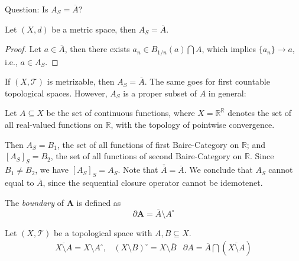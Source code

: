 Question: Is $A_S=\overline{A}$?

\begin{proposition}
Let $(X,d)$ be a metric space, then $A_S=\bar{A}$.
\end{proposition}

\begin{proof}
Let $a\in\overline{A}$, 
then there exists $a_n\in B_{1/n}(a)\bigcap A$, 
which implies $\{a_n\}\to a$, i.e., 
$a\in A_S$.
\end{proof}

\begin{remark}
If $(X,\mathcal{T})$ is metrizable, then $A_S=\overline A$. 
The same goes for first countable topological spaces.
However, $A_S$ is a proper subset of $A$ in general:

Let $A\subseteq X$ be the set of continuous functions, where $X=\mathbb{R}^{\mathbb{R}}$ denotes the set of all real-valued functions on $\mathbb{R}$, with the topology of pointwise convergence.

Then $A_S=B_1$, the set of all functions of first Baire-Category on $\mathbb{R}$; and $[A_S]_S=B_2$, the set of all functions of second Baire-Category on $\mathbb{R}$. Since $B_1\ne B_2$, we have $[A_S]_S=A_S$. Note that $\overline{\overline{A}}=\overline{A}$. We conclude that $A_S$ cannot equal to $\overline{A}$, since the sequential closure operator cannot be idemotenet.
\end{remark}

\begin{definition}[Boundary]
The \emph{boundary} of $\bm A$ is defined as
\[
\partial\bm A=\overline{A}\setminus A^\circ
\]
\end{definition}

\begin{proposition}
Let $(X,\mathcal{T})$ be a topological space with $A,B\subseteq X$.
\[
\begin{array}{lll}
\overline{X\setminus A}=X\setminus A^\circ,
&
(X\setminus B)^\circ = X\setminus\overline{B}&
\partial A=\overline{A}\bigcap(\overline{X\setminus A})
\end{array}
\]
\end{proposition}

